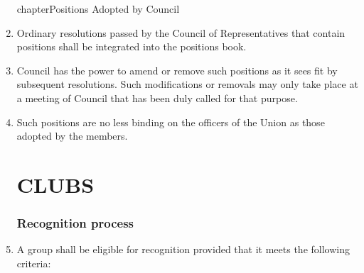 \documentclass[oneside]{book}
\begin{document}
\begin{enumerate}
chapter{\label{POSITIONS_ADOPTED_BY_COUNCIL}Positions Adopted by Council}

\item Ordinary resolutions passed by the Council of Representatives that contain positions 
shall be integrated into the positions book.
\item Council has the power to amend or remove such positions as it sees fit by subsequent 
resolutions. Such modifications or removals may only take place at a meeting of Council 
that has been duly called for that purpose.
\item Such positions are no less binding on the officers of the Union as those adopted by the members.


\part{\label{CLUBS}CLUBS }

\section{\label{Recognition_process}Recognition process }
\item A group shall be eligible for recognition provided that it meets the
following criteria: 


\end{enumerate}
\end{document}
